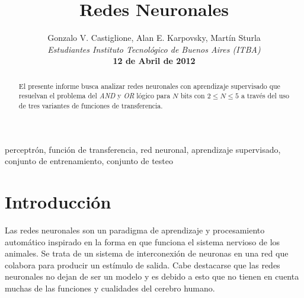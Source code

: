 \documentclass[%
    final,
    reprint,
    notitlepage,
    narroweqnarray,
    inline,
    twoside,
    invited
    ]{ieee}
\begin{document}
\title[Redes Neuronales]{%
       Redes Neuronales}

\author[Castiglione, Karpovsky, Sturla]{Gonzalo V. Castiglione, Alan E. Karpovsky, Martín Sturla\\\textit{Estudiantes 
       Instituto Tecnológico de Buenos Aires (ITBA)}\\
\textbf{12 de Abril de 2012}
}



\lognumber{}
\pubitemident{}


\maketitle               

\begin{abstract} 
El presente informe busca analizar  redes neuronales 
con aprendizaje supervisado que resuelvan el problema del \textit{AND} y \textit{OR} lógico para $N$ bits 
con $2 \le N \le 5$ a través del uso de tres variantes de funciones de transferencia.

\end{abstract}

\begin{keywords}
perceptrón, función de transferencia, red neuronal, aprendizaje supervisado, conjunto de entrenamiento, conjunto de testeo
\end{keywords}

\section{Introducción}

\PARstart Las redes neuronales son un paradigma de aprendizaje y procesamiento automático inspirado 
en la forma en que funciona el sistema nervioso de los animales. Se trata de un sistema de interconexión de 
neuronas en una red que colabora para producir un estímulo de salida. Cabe destacarse que las redes neuronales no 
dejan de ser un modelo y es debido a esto que no tienen en cuenta muchas de las funciones y cualidades del cerebro humano.
\end{document}
